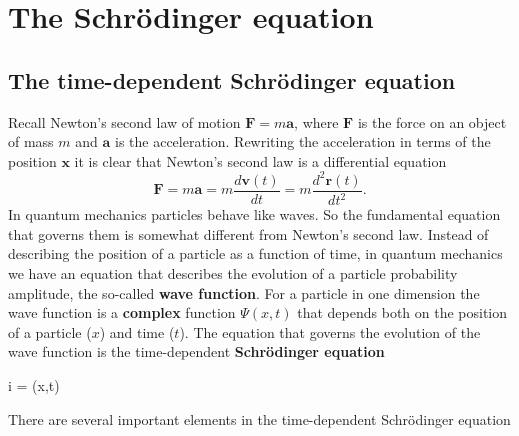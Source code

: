 \documentclass[../Main/chem331-notes.tex]{subfiles}
\begin{document}
\setcounter{section}{3}

\section{The Schr\"{o}dinger equation}
\subsection{The time-dependent Schr\"{o}dinger equation}
Recall Newton's second law of motion $\mathbf{F} = m \mathbf{a}$, where $\mathbf{F}$ is the force on an object of mass $m$ and $\mathbf{a}$ is the acceleration. Rewriting the acceleration in terms of the position $\mathbf{x}$ it is clear that Newton's second law is a differential equation
\begin{equation}
\mathbf{F} = m \mathbf{a} = m \frac{d \mathbf{v}(t)}{dt} = m \frac{d^2 \mathbf{r}(t)}{dt^2}.
\end{equation}
In quantum mechanics particles behave like waves. So the fundamental equation that governs them is somewhat different from Newton's second law.
Instead of describing the position of a particle as a function of time, in quantum mechanics we have an equation that describes the evolution of a particle probability amplitude, the so-called \textbf{wave function}.
For a particle in one dimension the wave function is a \textbf{complex} function $\Psi(x,t)$ that depends both on the position of a particle ($x$) and time ($t$).
 The equation that governs the evolution of the wave function is the time-dependent \textbf{Schr\"{o}dinger equation}
\begin{iequation}
i\hbar {} =  \Psi(x,t)
\end{iequation}
There are several important elements in the time-dependent Schr\"{o}dinger equation
\end{document}
